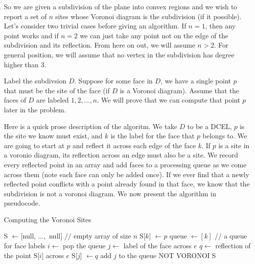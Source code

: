 \documentclass[11pt]{article}
\begin{document}
\answer
So we are given a subdivision of the plane into convex regions and we wish to report a set of $n$ sites whose Voronoi diagram is the subdivision (if it possible).
Let's consider two trivial cases before giving an algorithm.
If $n=1$, then any point works and if $n=2$ we can just take any point not on the edge of the subdivision and its reflection.
From here on out, we will assume $n > 2$.
For general position, we will assume that no vertex in the subdivision has degree higher than 3.

Label the subdivsion $D$.
Suppose for some face in $D$, we have a single point $p$ that must be the site of the face (if $D$ is a Voronoi diagram).
Assume that the faces of $D$ are labeled $1, 2, \ldots, n$.
We will prove that we can compute that point $p$ later in the problem.

Here is a quick prose description of the algoritm.
We take $D$ to be a DCEL, $p$ is the site we know must exist, and $k$ is the label for the face that $p$ belongs to.
We are going to start at $p$ and reflect it across each edge of the face $k$.
If $p$ is a site in a voronio diagram, its reflection across an edge must also be a site.
We record every reflected point in an array and add faces to a processing queue as we come across them (note each face can only be added once).
If we ever find that a newly reflected point conflicts with a point already found in that face, we know that the subdivision is not a voronoi diagram.
We now present the algorithm in pseudocode.

\begin{algorithm}
\caption{Computing the Voronoi Sites}
\label{alg:voronoisites}
    \begin{algorithmic}[1]
        \State S $\gets [$null, $\ldots, $ null$]$ // empty array of size $n$
        \State S[$k$] $\gets p$
        \State queue $\gets [ k ]$  // a queue for face labels
            \State $i \gets$ pop the queue
                \State $j \gets $ label of the face across $e$
                \State $q \gets $ reflection of the point S[$i$] across $e$
                    \State S[$j$] $\gets q$
                    \State add $j$ to the queue
                    \State \Return NOT VORONOI
                \EndIf
            \EndFor
        \EndWhile
        \State \Return S
    \EndFunction
    \end{algorithmic}
\end{algorithm}
\end{document}
